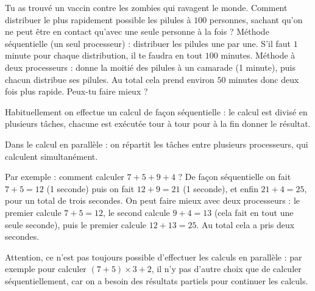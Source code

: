 \documentclass[11pt,class=report,crop=false]{standalone}
\begin{document}





\begin{cours}

Tu as trouvé un vaccin contre les zombies qui ravagent le monde. Comment distribuer le plus rapidement possible les pilules à $100$ personnes, sachant qu'on ne peut être en contact qu'avec une seule personne à la fois ? Méthode séquentielle (un seul processeur) : distribuer les pilules une par une. S'il faut $1$ minute pour chaque distribution, il te faudra en tout $100$ minutes.
Méthode à deux processeurs : donne la moitié des pilules à un camarade (1 minute), puis chacun distribue ses pilules. Au total cela prend environ $50$ minutes donc deux fois plus rapide.
Peux-tu faire mieux ?

\bigskip

Habituellement on effectue un calcul de façon séquentielle : le calcul est divisé en plusieurs tâches, chacune est exécutée tour à tour pour à la fin donner le résultat. 

Dans le calcul en parallèle : on répartit les tâches entre plusieurs processeurs, qui calculent simultanément. 


Par exemple : comment calculer $7+5+9+4$ ? De façon séquentielle on fait $7+5=12$ (1 seconde)
puis on fait $12+9=21$ (1 seconde), et enfin $21+4=25$, pour un total de trois secondes.
On peut faire mieux avec deux processeurs : le premier calcule $7+5=12$, le second calcule $9+4=13$ (cela fait en tout une seule seconde), puis le premier calcule $12+13=25$. Au total cela a pris deux secondes.



Attention, ce n'est pas toujours possible d'effectuer les calculs en parallèle : par exemple pour calculer $(7+5)\times 3 + 2$, il n'y pas d'autre choix que de calculer séquentiellement, car on a besoin des résultats partiels pour continuer les calculs.
\end{cours}
\end{document}
